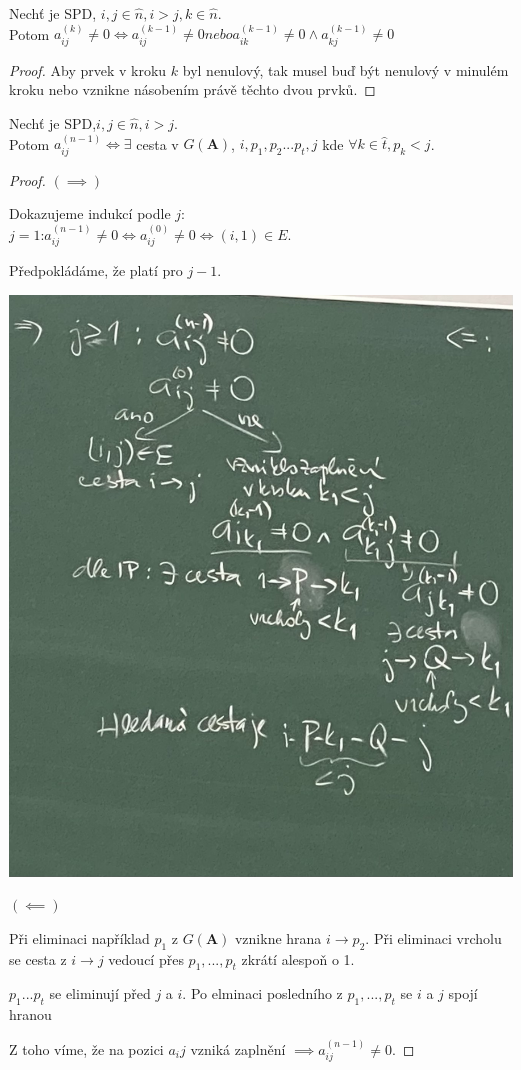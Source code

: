 \documentclass[../main.tex]{subfiles}
\begin{document}
\begin{lemma}[O zaplnění]
    Nechť \matAsquare je SPD, $i,j\in \hat{n}, i>j, k\in \hat{n}$.\\
    Potom $a_{ij}^{(k)} \neq 0 \Leftrightarrow a_{ij}^{(k-1)} \neq 0 nebo a_{ik}^{(k-1)} \neq 0 \wedge a_{kj}^{(k-1)} \neq 0$
\end{lemma}

\begin{proof}
    Aby prvek v kroku $k$ byl nenulový, tak musel buď být nenulový v minulém kroku nebo vznikne násobením právě těchto dvou prvků.
\end{proof}

\begin{theorem}[O zaplnění]
    Nechť \matAsquare je SPD,$i,j\in \hat{n}, i>j$.\\
    Potom $a_{ij}^{(n-1)} \Leftrightarrow \exists$ cesta v $G(\mathbf{A})$, $i,p_1,p_2... p_t,j$ kde $\forall k \in \hat{t}, p_k < j$.
\end{theorem}

\begin{proof}
    $(\implies)$

    Dokazujeme indukcí podle $j$: \\$j=1$:$ a_{ij}^{(n-1)} \neq 0 \Leftrightarrow a_{ij}^{(0)} \neq 0 \Leftrightarrow (i,1)\in E$.

    Předpokládáme, že platí pro $j-1$.

    \begin{center}
        \includegraphics[width=0.5\linewidth]{images/19-10-dukazzleva.jpg}
    \end{center}

    $(\impliedby)$ 
    
    Při eliminaci například $p_1$ z $G(\mathbf{A})$ vznikne 
    hrana $i\rightarrow p_2$. Při eliminaci vrcholu se cesta 
    z $i \rightarrow j$ vedoucí přes $p_1,...,p_t$ zkrátí 
    alespoň o 1.

    $p_1 ... p_t$ se eliminují před $j$ a $i$. Po elminaci 
    posledního z $p_1,...,p_t$ se $i$ a $j$ spojí hranou

    Z toho víme, že na pozici $a_ij$ vzniká zaplnění $\implies a_{ij}^{(n-1)}\neq 0$.
\end{proof}
\end{document}
